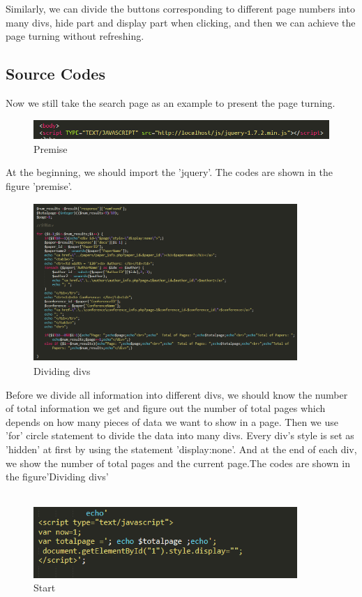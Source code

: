 \documentclass{book}
\begin{document}
Similarly, we can divide the buttons corresponding to different page numbers into many divs, hide part and display part when clicking, and then we can achieve the page turning without refreshing.


\subsection{Source Codes}
Now we still take the search page as an example to present the page turning.

\begin{figure}[H]
\centering
\includegraphics[scale = 0.35]{img/dsw_2.png}
\caption{Premise}
\end{figure}

At the beginning, we should import the 'jquery'. The codes are shown in the figure 'premise'.


\begin{figure}[H]
\centering
\includegraphics[height=6.0cm,width=10.0cm]{img/dsw_divide.png}
\caption{Dividing divs}
\end{figure}


Before we divide all information into different divs, we should know the number of total information we get and figure out the number of total pages which depends on how many pieces of data we want to show in a page. Then we use 'for' circle statement to divide the data into many divs. Every div's
style is set as 'hidden' at first by using the statement 'display:none'. And at the end of each div, we show the number of total pages and the current page.The codes are shown in the figure'Dividing divs'\\\\

\begin{figure}[H]
\centering
\includegraphics[width=10.0cm]{img/dsw_3.png}
\caption{Start}
\end{figure}
\end{document}
